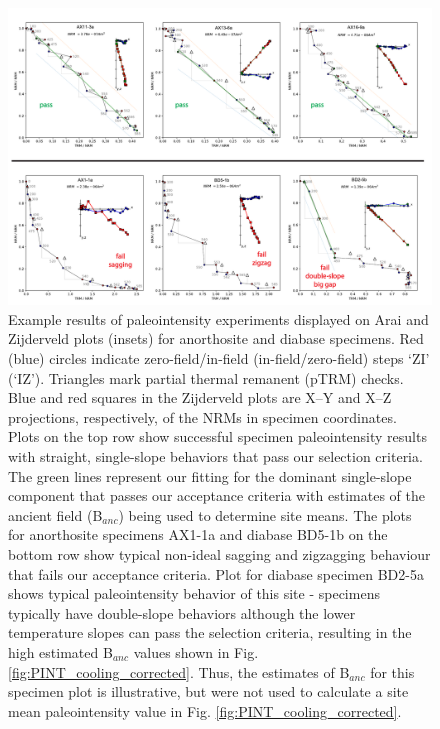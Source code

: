 \documentclass[9pt,twocolumn,twoside,lineno]{pnas-new}
\begin{document}
\begin{figure}
\noindent\includegraphics[width=17.8cm]{IZZI_examples.pdf}
\centering
\caption{\footnotesize{Example results of paleointensity experiments displayed on Arai and Zijderveld plots (insets) for anorthosite and diabase specimens. Red (blue) circles indicate zero-field/in-field (in-field/zero-field) steps `ZI’ (`IZ’). Triangles mark partial thermal remanent (pTRM) checks. Blue and red squares in the Zijderveld plots are X–Y and X–Z projections, respectively, of the NRMs in specimen coordinates. Plots on the top row show successful specimen paleointensity results with straight, single-slope behaviors that pass our selection criteria. The green lines represent our fitting for the dominant single-slope component that passes our acceptance criteria with estimates of the ancient field (B$_{anc}$) being used to determine site means. The plots for anorthosite specimens AX1-1a and diabase BD5-1b on the bottom row show typical non-ideal sagging and zigzagging behaviour that fails our acceptance criteria. Plot for diabase specimen BD2-5a shows typical paleointensity behavior of this site - specimens typically have double-slope behaviors although the lower temperature slopes can pass the selection criteria, resulting in the high estimated B$_{anc}$ values shown in Fig. \ref{fig:PINT_cooling_corrected}. Thus, the estimates of B$_{anc}$ for this specimen plot is illustrative, but were not used to calculate a site mean paleointensity value in Fig. \ref{fig:PINT_cooling_corrected}.}}
\label{fig:IZZI_examples}
\end{figure}
\end{document}
